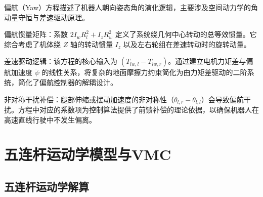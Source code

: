 \documentclass[
  oneside,
  degree=bachelor,
  fullwidthstop=false,
  fontset=fandol,
  times=false,
  minted=true,
  biblatex=true,
]{tongjithesis}
\begin{document}
偏航（Yaw）方程描述了机器人朝向姿态角的演化逻辑，主要涉及空间动力学的角动量守恒与差速驱动原理。

偏航惯量矩阵：系数 $2I_w R_{l}^{2} + I_z R_{w}^{2}$ 定义了系统绕几何中心转动的总等效惯量。它综合考虑了机体绕 $Z$ 轴的转动惯量 $I_z$ 以及左右轮组在差速转动时的旋转动量。

差速驱动逻辑：该方程的核心输入为 $(T_{lw,l} - T_{lw,r})$。通过建立电机力矩差与偏航加速度 $\ddot{\psi}$ 的线性关系，将复杂的地面摩擦力约束简化为由力矩差驱动的二阶系统，简化了偏航控制器的解耦设计。

非对称干扰补偿：腿部伸缩或摆动加速度的非对称性（$\ddot{\theta}_{l,r} - \ddot{\theta}_{l,l}$）会导致偏航干扰。方程中对应的系数项为控制算法提供了前馈补偿的理论依据，以确保机器人在高速直线行驶中不发生偏离。

\section{五连杆运动学模型与VMC}

\subsection{五连杆运动学解算}
\end{document}
